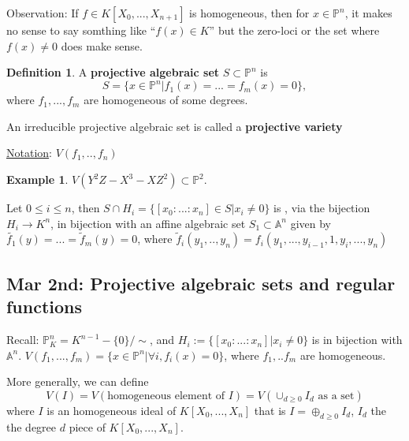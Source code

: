 \documentclass[11pt]{article}
\theoremstyle{definition}
\newtheorem{dfn}[thm]{Definition}
\newtheorem{ex}[thm]{Example}
\newcommand{\affn}{\mathbb A}
\newcommand{\proj}{\mathbb P}
\newcommand{\lrta}{\longrightarrow}
\begin{document}
Observation: If $f\in K[X_0,...,X_{n+1}]$ is homogeneous, then for $x\in \proj^n$, it makes no sense to say somthing like ``$f(x)\in K$''  but the zero-loci or the set where $f(x)\neq 0$ does make sense.

\begin{dfn}
 A  \textbf{projective algebraic set} $S\subset \proj^n$ is 
 $$
  S=\{ x\in \proj^n|f_1(x)=...=f_m(x)=0\},
 $$
 where $f_1,...,f_m$ are homogeneous of some degrees.

 An irreducible projective algebraic set is called a \textbf{projective variety}
\end{dfn}

\underline{Notation}: $V(f_1,..,f_n)$

\begin{ex}
$V(Y^2 Z-X^3-X Z^2)\subset \proj^2$. 
\end{ex}
Let $0\leq i\leq n$, then $S\cap H_i=\{[x_0:...:x_n]\in S| x_i\neq 0\}$ is , via the bijection  $H_i\lrta K^n$, in bijection with an affine algebraic set $S_1\subset \affn^n$ given by $\tilde{f_1}(y)=...=\tilde{f}_m(y)=0$, where $\tilde{f}_i(y_1,..,y_n)=f_i(y_1,...,y_{i-1},1, y_i,...,y_n)$


\subsection{Mar 2nd: Projective algebraic sets and regular functions}
Recall: $\proj^n_K=K^{n-1}-\{0\}/\sim$, and $H_i:=\{[x_0:...:x_n]|x_i\neq 0\}$ is in bijection with $\affn^n$. $V(f_1,...,f_m)=\{x\in \proj^n|\forall i,f_i(x)=0\}$, where $f_1,..f_m$ are homogeneous.

More generally, we can define 
$$
V(I)=V(\text{homogeneous element of $I$})=V(\cup_{d\geq 0} I_d\text{ as a set})
$$
where $I$ is an homogeneous ideal of $K[X_0,...,X_n]$ that is  $I=\oplus_{d\geq 0} I_d$, $I_d$ the the degree $d$ piece of $K[X_0,...,X_n]$.
\end{document}

